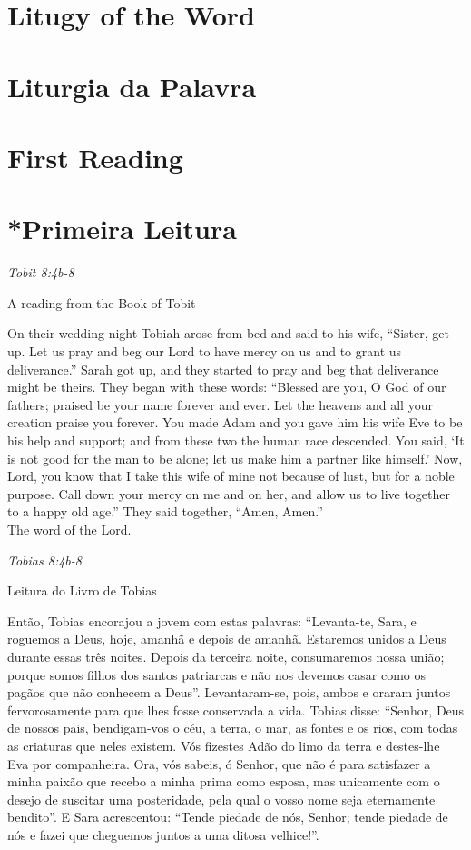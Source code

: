 \documentclass[10pt,a4]{article}
\newcommand \sect[2] {\section*{#1} \switchcolumn \section*{#2} \switchcolumn*}
\begin{document}
\begin{paracol}{2}

 \sect{Litugy of the Word}{Liturgia da Palavra}

 \sect{First Reading}{*Primeira Leitura}

 \textit{Tobit 8:4b-8}

\hspace{2em} A reading from the Book of Tobit

On their wedding night Tobiah arose from bed and said to his wife,
“Sister, get up. Let us pray and beg our Lord to have mercy on
us and to grant us deliverance.”
Sarah got up, and they started to pray
and beg that deliverance might be theirs.
They began with these words:
“Blessed are you, O God of our fathers;
praised be your name forever and ever.
Let the heavens and all your creation
praise you forever.
You made Adam and you gave him his wife Eve to be his help
and support;
and from these two the human race descended.
You said, ‘It is not good for the man to be alone;
let us make him a partner like himself.’
Now, Lord, you know that I take this wife of mine not because
of lust,
but for a noble purpose.
Call down your mercy on me and on her,
and allow us to live together to a happy old age.”
They said together, “Amen, Amen.” \\

The word of the Lord. 


\switchcolumn

\textit{Tobias 8:4b-8}

\hspace{2em} Leitura do Livro de Tobias

Então, Tobias encorajou a jovem com estas palavras: “Levanta-te, Sara, e roguemos a Deus, hoje, amanhã e depois de amanhã. Estaremos unidos a Deus durante essas três noites. Depois da terceira noite, consumaremos nossa união;
porque somos filhos dos santos patriarcas e não nos devemos casar como os pagãos que não conhecem a Deus”.
Levantaram-se, pois, ambos e oraram juntos fervorosamente para que lhes fosse conservada a vida.
Tobias disse: “Senhor, Deus de nossos pais, bendigam-vos o céu, a terra, o mar, as fontes e os rios, com todas as criaturas que neles existem.
Vós fizestes Adão do limo da terra e destes-lhe Eva por companheira.
Ora, vós sa­beis, ó Senhor, que não é para satisfazer a minha paixão que recebo a minha prima como esposa, mas unicamente com o desejo de suscitar uma posteridade, pela qual o vosso nome seja eternamente bendito”.
E Sara acrescentou: “Tende piedade de nós, Senhor; tende piedade de nós e fazei que cheguemos juntos a uma ditosa velhice!”.\\


\end{paracol}
\end{document}
